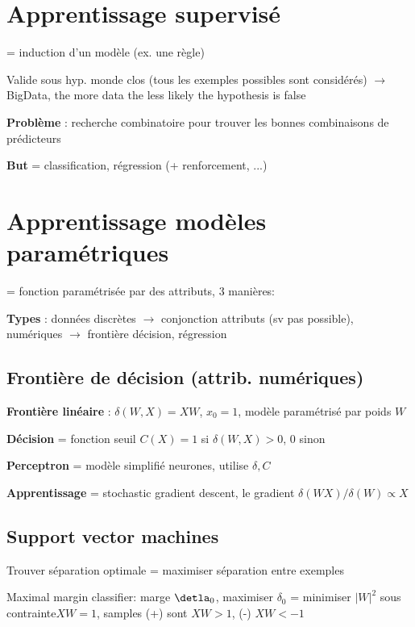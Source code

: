 \section*{Apprentissage supervisé}

= induction d'un modèle (ex. une règle)

Valide sous hyp. monde clos (tous les exemples possibles sont considérés) $\rightarrow$ BigData, the more data the less likely the hypothesis is false


\textbf{Problème} : recherche combinatoire pour trouver les bonnes combinaisons de prédicteurs

\textbf{But} = classification, régression (+ renforcement, ...)


\section*{Apprentissage modèles paramétriques}

= fonction paramétrisée par des attributs, 3 manières:

\textbf{Types} : données discrètes $\rightarrow$ conjonction attributs (sv pas possible), numériques $\rightarrow$ frontière décision, régression

\subsection*{Frontière de décision (attrib. numériques)}

\textbf{Frontière linéaire} : $\delta(W,X) = XW$, $x_0=1$, modèle paramétrisé par poids $W$

\textbf{Décision} = fonction seuil $C(X) = 1$ si $\delta(W,X)>0$, 0 sinon

\textbf{Perceptron} = modèle simplifié neurones, utilise $\delta, C$

\textbf{Apprentissage} = stochastic gradient descent, le gradient $\delta(WX)/\delta(W) \propto X$


\subsection*{Support vector machines}

Trouver séparation optimale = maximiser séparation entre exemples

Maximal margin classifier: marge $\detla_0$, maximiser $\delta_0$ = minimiser $|W|^2$ sous contrainte$XW=1$, samples (+) sont $XW>1$, (-) $XW<-1$

